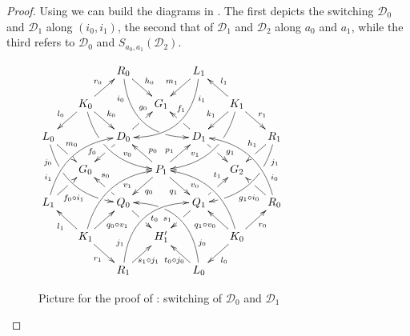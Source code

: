 \documentclass[a4paper,UKenglish,cleveref,pdftex,thm-restate,numberwithinsect,anonymous]{lipics}
\newcommand{\dder}[1]{\mathscr{#1}}
\begin{document}
\begin{proof}   
	Using  we can build the diagrams in .  The first depicts the  switching $\dder{D}_0$ and $\dder{D}_1$ along  $(i_0, i_1)$, the second that of $\dder{D}_1$ and $\dder{D}_2$ along $a_0$ and $a_1$, while the third refers to $\dder{D}_0$ and
	$S_{a_0,a_1}(\dder{D}_2)$.
	
	\begin{figure}[h]
		\centering
	$\xymatrix@C=15pt@R=15pt{&&R_0 \ar@/_.8cm/[ddrr]_(.2){i_0}|(.7)\hole
		\ar[dr]^{h_0}&& L_1\ar@/^.8cm/[ddll]^(.2){i_1}
		\ar[dl]_{m_1}\\&K_0\ar[dr]^{k_0}\ar[dl]_{l_0}
		\ar@/_.6cm/[ddrr]|(.36)\hole^(.65){v_0}\ar[ur]^{r_0}&& G_1 &&
		K_1
		\ar@/^.6cm/[ddll]|(.36)\hole_(.65){v_1}\ar[dl]_{k_1}\ar[lu]_{l_1}
		\ar[dr]^{r_1}\\L_0
		\ar@/_.6cm/[ddrr]_(.2){j_0}|(.31)\hole|(.81)\hole
		\ar[dr]^(.4){m_0}|(.61)\hole && D_0
		\ar[dl]|(.4)\hole_(.65){f_0}\ar[ur]|(.5)\hole^(.7){g_0}&&D_1
		\ar[dr]|(.4)\hole^(.65){g_1}
		\ar[ul]|(.5)\hole_(.65){f_1}&&R_1\ar@/^.6cm/[ddll]^(.2){j_1}|(.31)\hole|(.81)\hole\ar[dl]_(.4){h_1}|(.6)\hole\\&G_0
		&&P_1\ar[dr]_{q_1}
		\ar[dl]^{q_0}\ar[ur]^(.4){p_1}\ar[ul]_(.4){p_0}&&G_2\\L_1
		\ar@/^.6cm/[uurr]^(.2){i_1} \ar[ur]_(.35){f_0\circ
			i_1}|(.61)\hole&&Q_0
		\ar[ul]|(.4)\hole_(.65){s_0}\ar[dr]|(.5)\hole^(.65){t_0}
		&&Q_1\ar[ur]|(.4)\hole^(.65){t_1} \ar[dl]|(.5)\hole_(.65){s_1}
		&& R_0 \ar[ul]^(.35){g_1\circ
			i_0}|(.61)\hole\ar@/_.6cm/[uull]_(.2){i_0}\\&K_1
		\ar[ur]_{q_0\circ v_1} \ar[dr]_{r_1}
		\ar[ul]^{l_1}\ar@/^.6cm/[uurr]_(.65){v_1}&&H'_1&& K_0
		\ar[ur]_{r_0} \ar[ul]^{q_1\circ v_0} \ar[dl]^{l_0}
		\ar@/_.6cm/[uull]^(.65){v_0}\\&& R_1
		\ar[ur]_{\hspace{-6pt}s_1\circ
			j_1}\ar@/^.8cm/[uurr]^(.2){j_1}&& L_0 \ar[ul]^{t_0\circ
			j_0\hspace{-6pt}} \ar@/_.8cm/[uull]_(.2){j_0} |(.69)\hole
	}	$
		\caption{Picture for the proof of : switching of $\dder{D}_0$ and $\dder{D}_1$}
		\label{fi:first}
	\end{figure}
	

\end{proof}
\end{document}
